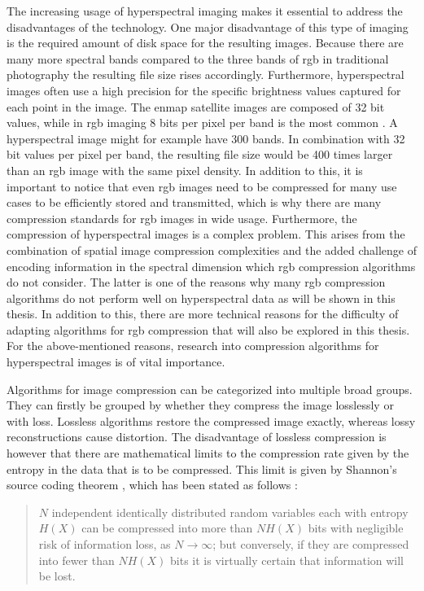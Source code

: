 The increasing usage of hyperspectral imaging makes it essential to address the disadvantages of the technology. One major disadvantage of this type of imaging is the required amount of disk space for the resulting images. Because there are many more spectral bands compared to the three bands of \ac{rgb} in traditional photography the resulting file size rises accordingly. Furthermore, hyperspectral images often use a high precision for the specific brightness values captured for each point in the image. The \ac{enmap} satellite images are composed of 32 bit values, while in \ac{rgb} imaging 8 bits per pixel per band is the most common \citep{guanter_enmap_2015}. A hyperspectral image might for example have 300 bands. In combination with 32 bit values per pixel per band, the resulting file size would be 400 times larger than an \ac{rgb} image with the same pixel density. In addition to this, it is important to notice that even \ac{rgb} images need to be compressed for many use cases to be efficiently stored and transmitted, which is why there are many compression standards for \ac{rgb} images in wide usage.
Furthermore, the compression of hyperspectral images is a complex problem. This arises from the combination of spatial image compression complexities and the added challenge of encoding information in the spectral dimension which \ac{rgb} compression algorithms do not consider. The latter is one of the reasons why many \ac{rgb} compression algorithms do not perform well on hyperspectral data as will be shown in this thesis. In addition to this, there are more technical reasons for the difficulty of adapting algorithms for \ac{rgb} compression that will also be explored in this thesis. For the above-mentioned reasons, research into compression algorithms for hyperspectral images is of vital importance.

Algorithms for image compression can be categorized into multiple broad groups. They can firstly be grouped by whether they compress the image losslessly or with loss. Lossless algorithms restore the compressed image exactly, whereas lossy reconstructions cause distortion. The disadvantage of lossless compression is however that there are mathematical limits to the compression rate given by the entropy in the data that is to be compressed. This limit is given by Shannon's source coding theorem \citep{shannon_mathematical_1948}, which has been stated as follows \citep{mackay_information_2003}:

\begin{quotation}
$N$ independent identically distributed random variables each with entropy $H(X)$ can be compressed into more than $NH(X)$ bits with negligible risk of information loss, as $N \rightarrow \infty$; but conversely, if they are compressed into fewer than $NH(X)$ bits it is virtually certain that information will be lost.
\end{quotation}

